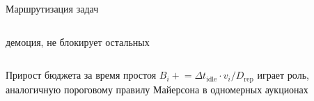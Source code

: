 \documentclass[aspectratio=169]{beamer}
\begin{document}
\begin{frame}{Маршрутизация задач}
\begin{columns}[T]
\begin{shadowbox2}
                        \vspace{0.1em}
                        {\scriptsize демоция,
                        не блокирует остальных}
                \end{shadowbox2}
        \end{columns}

        \vspace{0.3em}
        \begin{shadowbox}
                \footnotesize Прирост бюджета за время простоя
                $B_i \mathrel{+}= \Delta t_{\text{idle}} \cdot v_i
                / D_{\text{rep}}$ играет роль, аналогичную пороговому
                правилу Майерсона в одномерных аукционах
        \end{shadowbox}
\end{frame}
\end{document}
